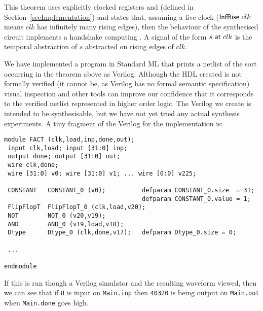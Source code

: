 \documentclass{llncs}
\begin{document}
This theorem uses explicitly clocked registers  and
 (defined in Section~\ref{secImplementation}) and states
that, assuming a live clock ($\mathsf{InfRise}~clk$ means $clk$
has infinitely many rising edges), then the behaviour of the
synthesised circuit implements a handshake computing
. A signal of the form $s~\mathsf{at}~clk$ is the temporal abstraction
of $s$ abstracted on rising edges of $clk$.

We have implemented a program in Standard ML that prints a netlist of
the sort occurring in the theorem above as Verilog. Although the HDL created is not
formally verified (it cannot be, as Verilog has no formal semantic
specification) visual inspection and other tools can improve our
confidence that it corresponds to the verified netlist
represented in higher order logic. The Verilog we create is intended
to be synthesisable, but we have not yet tried any actual synthesis
experiments. A tiny fragment of the Verilog for the 
implementation is:



{\footnotesize\baselineskip6pt\begin{verbatim}
module FACT (clk,load,inp,done,out);
 input clk,load; input [31:0] inp;
 output done; output [31:0] out;
 wire clk,done;
 wire [31:0] v0; wire [31:0] v1; ... wire [0:0] v225;

 CONSTANT   CONSTANT_0 (v0);          defparam CONSTANT_0.size  = 31;
                                      defparam CONSTANT_0.value = 1;
 FlipFlopT  FlipFlopT_0 (clk,load,v20);
 NOT        NOT_0 (v20,v19);
 AND        AND_0 (v19,load,v18);
 Dtype      Dtype_0 (clk,done,v17);   defparam Dtype_0.size = 0;

 ...

endmodule
\end{verbatim}}

\newpage

If this is run though a Verilog simulator and the
resulting waveform viewed, then we can see that if \texttt{8}
is input on \texttt{Main.inp} then \texttt{40320} is
being output on \texttt{Main.out} when \texttt{Main.done} goes high.

\vspace*{-24mm}


\mbox{}\hspace*{-5mm}


\end{document}
